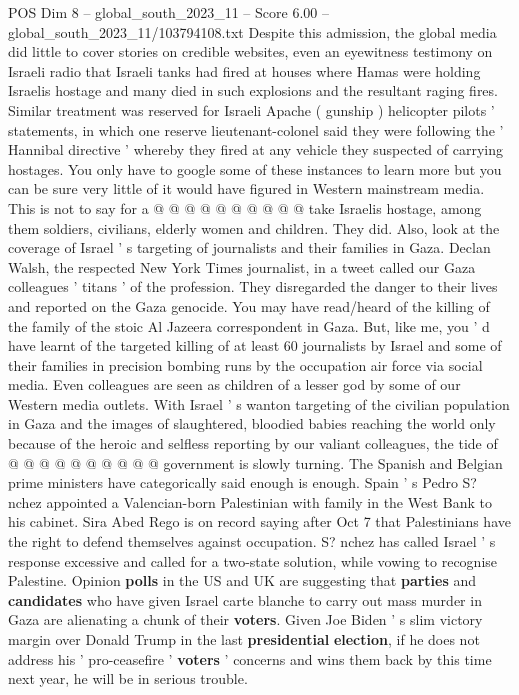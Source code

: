 \begin{textsample}{POS Dim 8 – global\_south\_2023\_11 – Score 6.00 – global\_south\_2023\_11/103794108.txt}
Despite this admission, the global media did little to cover stories on credible websites, even an eyewitness testimony on Israeli radio that Israeli tanks had fired at houses where Hamas were holding Israelis hostage and many died in such explosions and the resultant raging fires.
Similar treatment was reserved for Israeli Apache ( gunship ) helicopter pilots ' statements, in which one reserve lieutenant-colonel said they were following the ' Hannibal directive ' whereby they fired at any vehicle they suspected of carrying hostages.
You only have to google some of these instances to learn more but you can be sure very little of it would have figured in Western mainstream media.
This is not to say for a @ @ @ @ @ @ @ @ @ @ take Israelis hostage, among them soldiers, civilians, elderly women and children.
They did.
Also, look at the coverage of Israel ' s targeting of journalists and their families in Gaza.
Declan Walsh, the respected New York Times journalist, in a tweet called our Gaza colleagues ' titans ' of the profession.
They disregarded the danger to their lives and reported on the Gaza genocide.
You may have read/heard of the killing of the family of the stoic Al Jazeera correspondent in Gaza.
But, like me, you ' d have learnt of the targeted killing of at least 60 journalists by Israel and some of their families in precision bombing runs by the occupation air force via social media.
Even colleagues are seen as children of a lesser god by some of our Western media outlets.
With Israel ' s wanton targeting of the civilian population in Gaza and the images of slaughtered, bloodied babies reaching the world only because of the heroic and selfless reporting by our valiant colleagues, the tide of @ @ @ @ @ @ @ @ @ @ government is slowly turning.
The Spanish and Belgian prime ministers have categorically said enough is enough.
Spain ' s Pedro S? nchez appointed a Valencian-born Palestinian with family in the West Bank to his cabinet.
Sira Abed Rego is on record saying after Oct 7 that Palestinians have the right to defend themselves against occupation.
S? nchez has called Israel ' s response excessive and called for a two-state solution, while vowing to recognise Palestine.
Opinion \textbf{polls} in the US and UK are suggesting that \textbf{parties} and \textbf{candidates} who have given Israel carte blanche to carry out mass murder in Gaza are alienating a chunk of their \textbf{voters}.
Given Joe Biden ' s slim victory margin over Donald Trump in the last \textbf{presidential} \textbf{election}, if he does not address his ' pro-ceasefire ' \textbf{voters} ' concerns and wins them back by this time next year, he will be in serious trouble.

\end{textsample}
